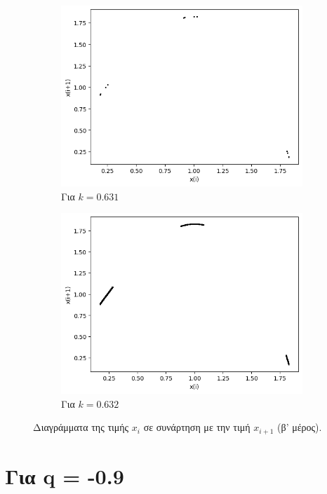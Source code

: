\begin{figure}[ht]
\begin{subfigure}[b]{0.4\textwidth}
		\includegraphics[width=\textwidth]{LateX images/graphs q07/g12}
		\caption{Για $k=0.631$}
		\label{f:k46}
	\end{subfigure}
	\hfill
	\begin{subfigure}[b]{0.4\textwidth}
		\centering
		\includegraphics[width=\textwidth]{LateX images/graphs q07/g13}
		\caption{Για $k=0.632$}
		\label{f:k47}
	\end{subfigure}
	\caption{Διαγράμματα της τιμής \(x_i\) σε συνάρτηση με την τιμή \(x_{i+1}\) (β' μέρος).}	
\end{figure}

\clearpage

\section{Για q = -0.9}

